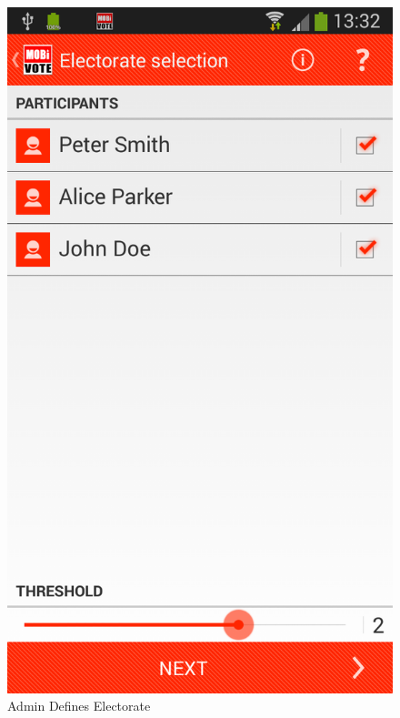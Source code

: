 \documentclass[numbers=noenddot, abstract=on, a4paper, headsepline,
footsepline, oneside, draft=off]{scrreprt}
\begin{document}
\begin{figure}[!htb]
	\begin{minipage}{.5\textwidth}
  		\centering
		\includegraphics[height=.4\textheight]{img/screenshots/electorate_selection}
		\caption{Admin Defines Electorate}
		\label{fig:handbook_electorateselection}
	\end{minipage}
	\begin{minipage}{.5\textwidth}
  		\centering

\end{minipage}
\end{figure}
\end{document}
